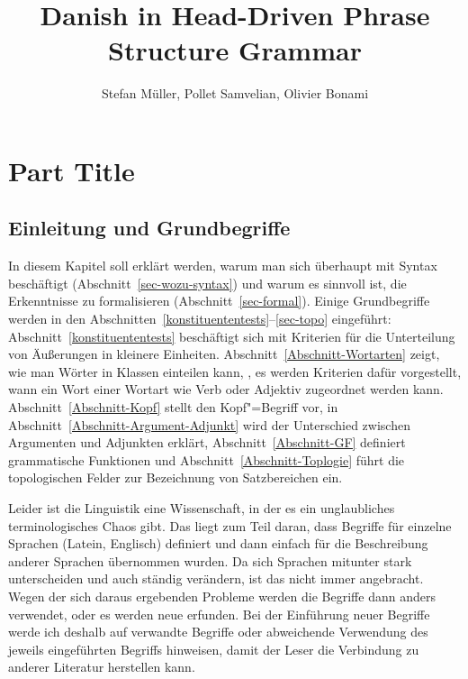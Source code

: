 \documentclass[ number=45
			   ,series=eotms
			   ,printondemand
			  ]{langsci}
\title{Danish in Head-Driven Phrase Structure Grammar  }
\author{Stefan M\"uller, Pollet Samvelian, Olivier Bonami}
\begin{document}
              
       
                
      
\maketitle                

\tableofcontents


\pagestyle{scrheadings}
  
\part{Part Title}	               



\chapter{Einleitung und Grundbegriffe}
\label{Kapitel-Grundbegriffe}

In diesem Kapitel soll erklärt werden, warum man sich überhaupt mit Syntax beschäftigt
(Abschnitt~\ref{sec-wozu-syntax}) und warum es sinnvoll ist, die Erkenntnisse zu formalisieren
(Abschnitt~\ref{sec-formal}).  Einige Grundbegriffe werden in den
Abschnitten~\ref{konstituententests}--\ref{sec-topo} eingeführt: Abschnitt~\ref{konstituententests}
beschäftigt sich mit Kriterien für die Unterteilung von Äußerungen in kleinere
Einheiten. Abschnitt~\ref{Abschnitt-Wortarten} zeigt, wie man Wörter in Klassen einteilen kann,
\dash, es werden Kriterien dafür vorgestellt, wann ein Wort einer Wortart wie \zb Verb oder Adjektiv
zugeordnet werden kann.  Abschnitt~\ref{Abschnitt-Kopf} stellt den Kopf"=Begriff vor, in
Abschnitt~\ref{Abschnitt-Argument-Adjunkt} wird der Unterschied zwischen Argumenten und Adjunkten
erklärt, Abschnitt~\ref{Abschnitt-GF} definiert grammatische Funktionen und
Abschnitt~\ref{Abschnitt-Toplogie} führt die topologischen Felder zur Bezeichnung von Satzbereichen
ein.

Leider ist die Linguistik eine Wissenschaft, in der es ein unglaubliches terminologisches Chaos
gibt. Das liegt zum Teil daran, dass Begriffe für einzelne Sprachen (\zb Latein, Englisch)
definiert und dann einfach für die Beschreibung anderer Sprachen übernommen wurden. Da sich
Sprachen mitunter stark unterscheiden und auch ständig verändern, ist das nicht immer
angebracht. Wegen der sich daraus ergebenden Probleme werden die Begriffe dann anders verwendet,
oder es werden neue erfunden. 
%
Bei der Einführung neuer Begriffe werde ich deshalb auf verwandte Begriffe oder abweichende
Verwendung des jeweils eingeführten Begriffs hinweisen, damit der Leser die Verbindung zu anderer
Literatur herstellen kann. 
\end{document}
